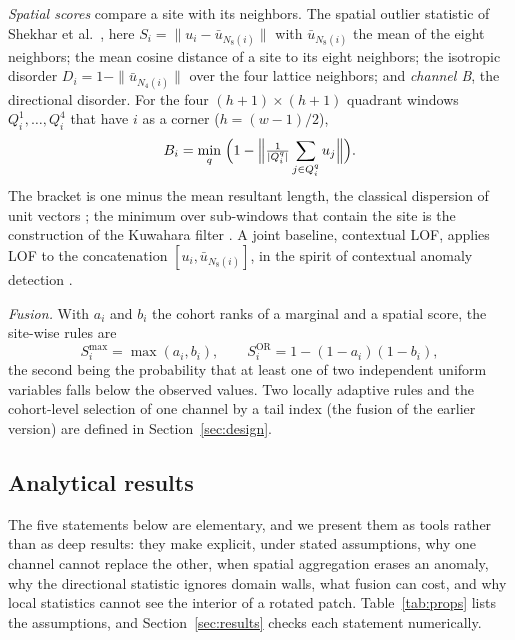 \documentclass[preprint,review,12pt]{elsarticle}
\begin{document}
\emph{Spatial scores} compare a site with its neighbors. The spatial outlier statistic of Shekhar et al.~\citep{Shekhar2003}, here $S_i=\|u_i-\bar u_{N_8(i)}\|$ with $\bar u_{N_8(i)}$ the mean of the eight neighbors; the mean cosine distance of a site to its eight neighbors; the isotropic disorder $D_i=1-\|\bar u_{N_4(i)}\|$ over the four lattice neighbors; and \emph{channel B}, the directional disorder. For the four $(h+1)\times(h+1)$ quadrant windows $Q_i^1,\dots,Q_i^4$ that have $i$ as a corner ($h=(w-1)/2$),
\begin{equation}
B_i=\min_{q}\;\Bigl(1-\Bigl\|\tfrac{1}{|Q_i^q|}\sum_{j\in Q_i^q}u_j\Bigr\|\Bigr).
\label{eq:dir}
\end{equation}
The bracket is one minus the mean resultant length, the classical dispersion of unit vectors \citep{Mardia2000}; the minimum over sub-windows that contain the site is the construction of the Kuwahara filter \citep{Kuwahara1976}. A joint baseline, contextual LOF, applies LOF to the concatenation $[u_i,\bar u_{N_8(i)}]$, in the spirit of contextual anomaly detection \citep{Song2007}.

\emph{Fusion.} With $a_i$ and $b_i$ the cohort ranks of a marginal and a spatial score, the site-wise rules are
\begin{equation}
S_i^{\max}=\max(a_i,b_i),\qquad S_i^{\mathrm{OR}}=1-(1-a_i)(1-b_i),
\label{eq:fusion}
\end{equation}
the second being the probability that at least one of two independent uniform variables falls below the observed values. Two locally adaptive rules and the cohort-level selection of one channel by a tail index (the fusion of the earlier version) are defined in Section~\ref{sec:design}.

\subsection{Analytical results}
The five statements below are elementary, and we present them as tools rather than as deep results: they make explicit, under stated assumptions, why one channel cannot replace the other, when spatial aggregation erases an anomaly, why the directional statistic ignores domain walls, what fusion can cost, and why local statistics cannot see the interior of a rotated patch. Table~\ref{tab:props} lists the assumptions, and Section~\ref{sec:results} checks each statement numerically.
\end{document}
